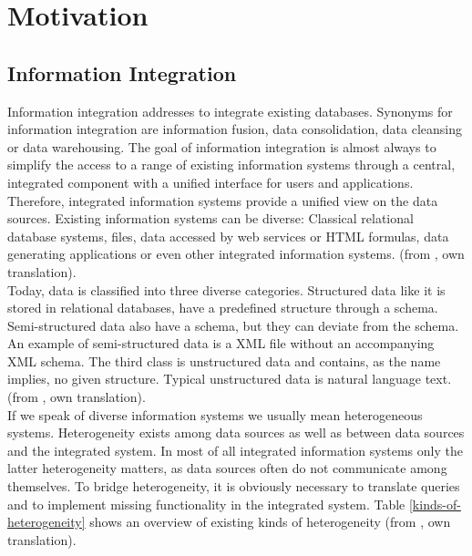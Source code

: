 \chapter{Motivation}
\section{Information Integration}

Information integration addresses to integrate existing databases. Synonyms for information integration are information fusion, data consolidation, data cleansing or data warehousing. The goal of information integration is almost always to simplify the access to a range of existing information systems through a central, integrated component with a unified interface for users and applications. Therefore, integrated information systems provide a unified view on the data sources. Existing information systems can be diverse: Classical relational database systems, files, data accessed by web services or HTML formulas, data generating applications or even other integrated information systems. (from \cite[p. 3-4]{DBLP:books/dp/LeserN2006}, own translation).\\
Today, data is classified into three diverse categories. Structured data like it is stored in relational databases, have a predefined structure through a schema.
Semi-structured data also have a schema, but they can deviate from the schema. An example of semi-structured data is a XML file without an accompanying XML schema. The third class is unstructured data and contains, as the name implies, no given structure. Typical unstructured data is natural language text.
(from \cite[p. 17]{DBLP:books/dp/LeserN2006}, own translation).\\
If we speak of diverse information systems we usually mean heterogeneous systems. Heterogeneity exists among data sources as well as between data sources and the integrated system. In most of all integrated information systems only the latter heterogeneity matters, as data sources often do not communicate among themselves. 
To bridge heterogeneity, it is obviously necessary to translate queries and to implement missing functionality in the integrated system. Table \ref{kinds-of-heterogeneity} shows an overview of existing kinds of heterogeneity (from \cite[p. 60/61]{DBLP:books/dp/LeserN2006}, own translation).

